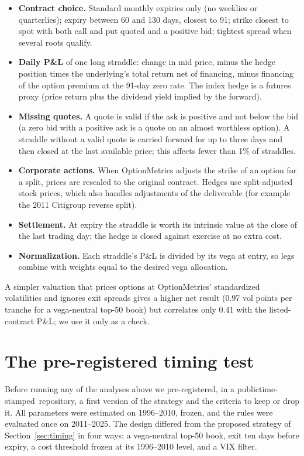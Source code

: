 \begin{itemize}
  \item \textbf{Contract choice.} Standard monthly expiries only (no weeklies or quarterlies); expiry between 60 and 130 days, closest to 91; strike closest to spot with both call and put quoted and a positive bid; tightest spread when several roots qualify.
  \item \textbf{Daily P\&L} of one long straddle: change in mid price, minus the hedge position times the underlying's total return net of financing, minus financing of the option premium at the 91-day zero rate. The index hedge is a futures proxy (price return plus the dividend yield implied by the forward).
  \item \textbf{Missing quotes.} A quote is valid if the ask is positive and not below the bid (a zero bid with a positive ask is a quote on an almost worthless option). A straddle without a valid quote is carried forward for up to three days and then closed at the last available price; this affects fewer than 1\% of straddles.
  \item \textbf{Corporate actions.} When OptionMetrics adjusts the strike of an option for a split, prices are rescaled to the original contract. Hedges use split-adjusted stock prices, which also handles adjustments of the deliverable (for example the 2011 Citigroup reverse split).
  \item \textbf{Settlement.} At expiry the straddle is worth its intrinsic value at the close of the last trading day; the hedge is closed against exercise at no extra cost.
  \item \textbf{Normalization.} Each straddle's P\&L is divided by its vega at entry, so legs combine with weights equal to the desired vega allocation.
\end{itemize}
A simpler valuation that prices options at OptionMetrics' standardized volatilities and ignores exit spreads gives a higher net result (0.97 vol points per tranche for a vega-neutral top-50 book) but correlates only 0.41 with the listed-contract P\&L; we use it only as a check.

\section{The pre-registered timing test}\label{app:prereg}

Before running any of the analyses above we pre-registered, in a \ifrepolink public\else time-stamped\fi\ repository, a first version of the strategy and the criteria to keep or drop it. All parameters were estimated on 1996--2010, frozen, and the rules were evaluated once on 2011--2025. The design differed from the proposed strategy of Section~\ref{sec:timing} in four ways: a vega-neutral top-50 book, exit ten days before expiry, a cost threshold frozen at its 1996--2010 level, and a VIX filter.

